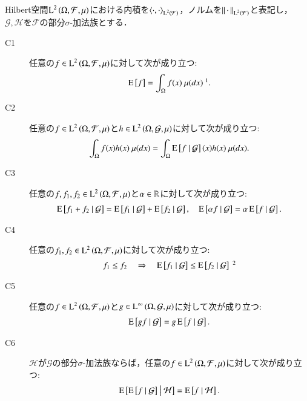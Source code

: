 	\begin{screen}
	\begin{thm}[条件付き期待値の性質]
		Hilbert空間$\operatorname{L}^{2} \left(\Omega, \mathcal{F},\mu\right)$における内積を$\inprod<\cdot,\cdot>_{\Lp{2}{\mathcal{F}}}$，ノルムを$\left\|\, \cdot\, \right\|_{\operatorname{L}^{2} \left(\mathcal{F}\right)}$と表記し，
		$\mathcal{G},\mathcal{H}$を$\mathcal{F}$の部分$\sigma$-加法族とする．
		\begin{description}
			\item[C1] 任意の$f \in \operatorname{L}^{2} \left(\Omega, \mathcal{F},\mu\right)$に対して次が成り立つ:
				\begin{align}
					\Exp{f} = \int_{\Omega} f(x)\ \mu(dx)\ \footnotemark.
				\end{align}
				
			\item[C2]	任意の$f \in \operatorname{L}^{2} \left(\Omega, \mathcal{F},\mu\right)$と$h \in \operatorname{L}^{2} \left(\Omega, \mathcal{G},\mu\right)$に対して次が成り立つ:
				\begin{align}
					\int_{\Omega} f(x)h(x)\ \mu(dx) = \int_{\Omega} \operatorname{E} \left[ f \ \middle|\ \mathcal{G} \right](x)h(x)\ \mu(dx).
				\end{align}
				
			\item[C3]	任意の$f,f_1,f_2 \in \operatorname{L}^{2} \left(\Omega, \mathcal{F},\mu\right)$と$\alpha \in \mathbb{R}$に対して次が成り立つ:
				\begin{align}
					\operatorname{E} \left[ f_1 + f_2 \ \middle|\ \mathcal{G} \right] = \operatorname{E} \left[ f_1 \ \middle|\ \mathcal{G} \right] + \operatorname{E} \left[ f_2 \ \middle|\ \mathcal{G} \right],
					\quad \operatorname{E} \left[ \alpha f \ \middle|\ \mathcal{G} \right] = \alpha \operatorname{E} \left[ f \ \middle|\ \mathcal{G} \right].
				\end{align}

			\item[C4]	任意の$f_1,f_2 \in \operatorname{L}^{2} \left(\Omega, \mathcal{F},\mu\right)$に対して次が成り立つ:
				\begin{align}
					f_1 \leq f_2 \quad \Rightarrow \quad \cexp{f_1}{\mathcal{G}} \leq \cexp{f_2}{\mathcal{G}} \ \footnotemark
				\end{align}
			
			\item[C5]	任意の$f \in \operatorname{L}^{2} \left(\Omega, \mathcal{F},\mu\right)$と$g \in \operatorname{L}^{\infty} \left(\Omega, \mathcal{G},\mu\right)$に対して次が成り立つ:
				\begin{align}
					\operatorname{E} \left[ gf \ \middle|\ \mathcal{G} \right] = g\operatorname{E} \left[ f \ \middle|\ \mathcal{G} \right].
				\end{align}
			
			\item[C6]	$\mathcal{H}$が$\mathcal{G}$の部分$\sigma$-加法族ならば，任意の$f \in \operatorname{L}^{2} \left(\Omega, \mathcal{F},\mu\right)$に対して次が成り立つ:
				\begin{align}
					\operatorname{E} \left[ \operatorname{E} \left[ f \ \middle|\ \mathcal{G} \right] \ \middle|\ \mathcal{H} \right] = \operatorname{E} \left[ f \ \middle|\ \mathcal{H} \right].
				\end{align}
		\end{description}
		\label{prp:L2_conditional_expectation}
	\end{thm}
	\end{screen}
	
